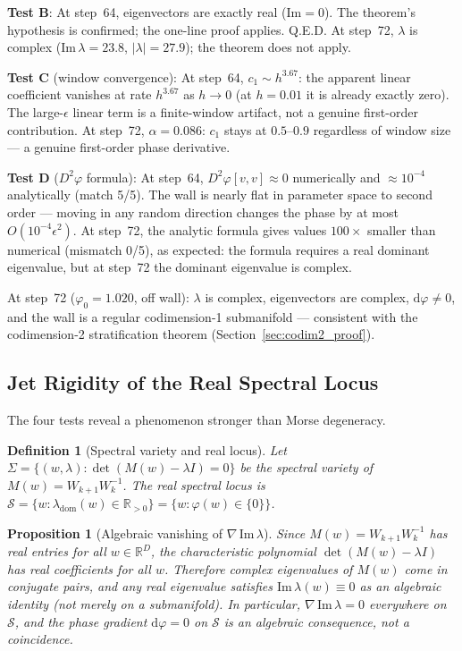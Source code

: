 \documentclass[11pt]{amsart}
\newtheorem{proposition}[theorem]{Proposition}
\newtheorem{definition}[theorem]{Definition}
\begin{document}
\textbf{Test B}: At step~64, eigenvectors are exactly real ($\mathrm{Im} = 0$).
The theorem's hypothesis is confirmed; the one-line proof applies. Q.E.D.
At step~72, $\lambda$ is complex ($\mathrm{Im}\,\lambda = 23.8$, $|\lambda| = 27.9$);
the theorem does not apply.

\textbf{Test C} (window convergence): At step~64, $c_1 \sim h^{3.67}$:
the apparent linear coefficient vanishes at rate $h^{3.67}$ as $h \to 0$
(at $h = 0.01$ it is already exactly zero).
The large-$\epsilon$ linear term is a finite-window artifact, not a genuine
first-order contribution.
At step~72, $\alpha = 0.086$: $c_1$ stays at $0.5$--$0.9$ regardless of window
size --- a genuine first-order phase derivative.

\textbf{Test D} ($D^2\varphi$ formula): At step~64, $D^2\varphi[v,v] \approx 0$
numerically and $\approx 10^{-4}$ analytically (match 5/5).
The wall is nearly flat in parameter space to second order --- moving in any
random direction changes the phase by at most $O(10^{-4}\epsilon^2)$.
At step~72, the analytic formula gives values $100\times$ smaller than
numerical (mismatch 0/5), as expected: the formula requires a real dominant
eigenvalue, but at step~72 the dominant eigenvalue is complex.

At step~72 ($\varphi_0 = 1.020$, off wall): $\lambda$ is complex,
eigenvectors are complex, $\mathrm{d}\varphi \neq 0$, and the wall
is a regular codimension-1 submanifold --- consistent with the
codimension-2 stratification theorem (Section~\ref{sec:codim2_proof}).

\subsection{Jet Rigidity of the Real Spectral Locus}
\label{sec:jet_rigidity}

The four tests reveal a phenomenon stronger than Morse degeneracy.

\begin{definition}[Spectral variety and real locus]
Let $\Sigma = \{(w, \lambda) : \det(M(w) - \lambda I) = 0\}$
be the spectral variety of $M(w) = W_{k+1}W_k^{-1}$.
The \emph{real spectral locus} is
$\mathcal{S} = \{w : \lambda_\mathrm{dom}(w) \in \mathbb{R}_{>0}\}
= \{w : \varphi(w) \in \{0\}\}$.
\end{definition}

\begin{proposition}[Algebraic vanishing of $\nabla\,\mathrm{Im}\,\lambda$]
\label{prop:algebraic_vanishing}
Since $M(w) = W_{k+1}W_k^{-1}$ has real entries for all $w \in \mathbb{R}^D$,
the characteristic polynomial $\det(M(w) - \lambda I)$ has real
coefficients for all $w$.
Therefore complex eigenvalues of $M(w)$ come in conjugate pairs,
and any real eigenvalue satisfies $\mathrm{Im}\,\lambda(w) \equiv 0$
as an algebraic identity (not merely on a submanifold).
In particular, $\nabla\,\mathrm{Im}\,\lambda = 0$ everywhere on
$\mathcal{S}$, and the phase gradient $\mathrm{d}\varphi = 0$ on $\mathcal{S}$
is an algebraic consequence, not a coincidence.
\end{proposition}
\end{document}
